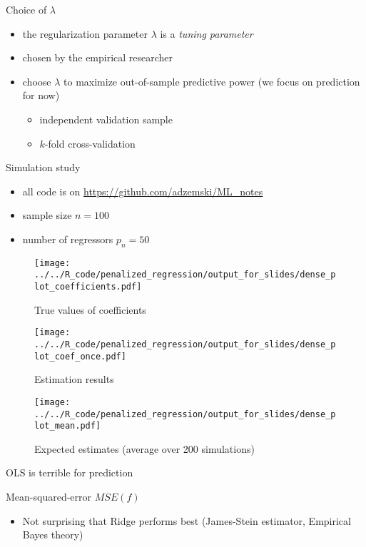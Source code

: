 \documentclass[xcolor=dvipsnames]{beamer}
\begin{document}
\begin{frame}{Choice of $\lambda$}
\begin{itemize}
\item the regularization parameter $\lambda$ is a \emph{tuning parameter}
\item chosen by the empirical researcher
\item choose $\lambda$ to maximize out-of-sample predictive power (we focus on prediction for now) 
\begin{itemize}
  \item independent validation sample 
  \item $k$-fold cross-validation
\end{itemize}
\end{itemize}
\end{frame}


\begin{frame}{Simulation study}
\begin{itemize}
  \item all code is on \url{https://github.com/adzemski/ML_notes}
  \item sample size $n = 100$
  \item number of regressors $p_n = 50$
\end{itemize}
\end{frame}


\begin{frame}
\begin{figure}
  \texttt{[image: ../../R\_code/penalized\_regression/output\_for\_slides/dense\_plot\_coefficients.pdf]}
   \caption{True values of coefficients}
\end{figure}
\end{frame}

\begin{frame}
\begin{figure}
  \texttt{[image: ../../R\_code/penalized\_regression/output\_for\_slides/dense\_plot\_coef\_once.pdf]}
   \caption{Estimation results}
\end{figure}
\end{frame}

\begin{frame}
\begin{figure}
  \texttt{[image: ../../R\_code/penalized\_regression/output\_for\_slides/dense\_plot\_mean.pdf]}
   \caption{Expected estimates (average over 200 simulations)}
\end{figure}
\end{frame}

\begin{frame}{OLS is terrible for prediction}
\begin{table}
  
  \caption{Mean-squared-error $MSE(f)$}
\end{table}
\begin{itemize}
  \item Not surprising that Ridge performs best (James-Stein estimator, Empirical Bayes theory)
\end{itemize}
\end{frame}
\end{document}
